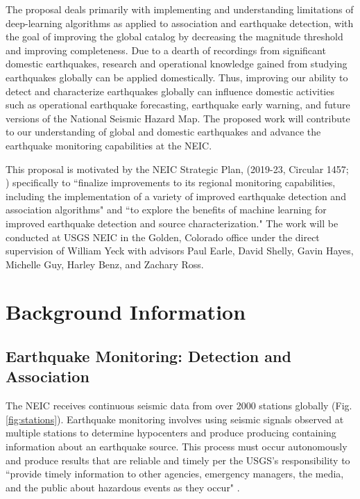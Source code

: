 \documentclass[12p]{article}
\begin{document}
The proposal deals primarily with implementing and understanding limitations of deep-learning algorithms as applied to association and earthquake detection, with the goal of improving the global catalog by decreasing the magnitude threshold and improving completeness. Due to a dearth of recordings from significant domestic earthquakes, research and operational knowledge gained from studying earthquakes globally can be applied domestically. Thus, improving our ability to detect and characterize earthquakes globally can influence domestic activities such as operational earthquake forecasting, earthquake early warning, and future versions of the National Seismic Hazard Map. The proposed work will contribute to our understanding of global and domestic earthquakes and advance the earthquake monitoring capabilities at the NEIC.

This proposal is motivated by the NEIC Strategic Plan, (2019-23, Circular 1457; \cite{Hayes2019sp}) specifically to ``finalize improvements to its regional monitoring capabilities, including the implementation of a variety of improved earthquake detection and association algorithms" and ``to explore the benefits of machine learning for improved earthquake detection and source characterization." The work will be conducted at USGS NEIC in the Golden, Colorado office under the direct supervision of William Yeck with advisors Paul Earle, David Shelly, Gavin Hayes, Michelle Guy, Harley Benz, and Zachary Ross.

\section*{Background Information}
\subsection*{Earthquake Monitoring: Detection and Association}

The NEIC receives continuous seismic data from over 2000 stations globally (Fig. \ref{fig:stations}). Earthquake monitoring involves using seismic signals observed at multiple stations to determine hypocenters and produce producing containing information about an earthquake source. This process must occur autonomously and produce results that are reliable and timely per the USGS's responsibility to ``provide timely information to other agencies, emergency managers, the media, and the public about hazardous events as they occur" \citep{Holmes2013}.
\end{document}
